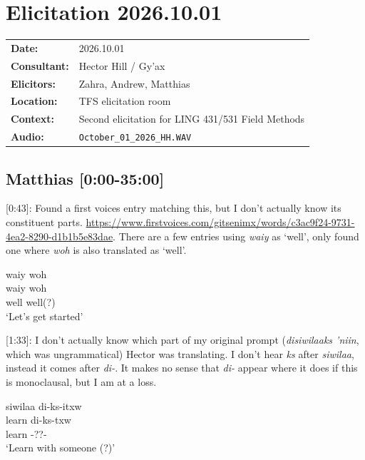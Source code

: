 \renewcommand{\ElicitationDate}{2026.10.01}

\section{Elicitation \ElicitationDate}

\begin{tabular}{ll}
\textbf{Date:} & \ElicitationDate \\
\textbf{Consultant:} & Hector Hill / Gy'ax \\
\textbf{Elicitors:} & Zahra, Andrew, Matthias \\
\textbf{Location:} & TFS elicitation room \\
\textbf{Context:} & Second elicitation for LING 431/531 Field Methods \\
\textbf{Audio:} & \texttt{October\_01\_2026\_HH.WAV} \\
\end{tabular}

\subsection{Matthias [0:00-35:00]}

[0:43]: Found a first voices entry matching this, but I don't actually know its constituent parts. \url{https://www.firstvoices.com/gitsenimx/words/c3ac9f24-9731-4ea2-8290-d1b1b5e83dae}. There are a few entries using \textit{waiy} as `well', only found one where \textit{woh} is also translated as `well'.

\begin{exe}
    \ex \glll waiy woh \\
    waiy woh \\
    well well(?) \\
    `Let's get started'
\end{exe}

[1:33]: I don't actually know which part of my original prompt (\textit{disiwilaaks 'niin}, which was ungrammatical) Hector was translating. I don't hear \textit{ks} after \textit{siwilaa}, instead it comes after \textit{di-}. It makes no sense that \textit{di-} appear where it does if this is monoclausal, but I am at a loss.
 
\begin{exe}
    \ex \glll siwilaa di-ks-itxw \\
    learn di-ks-txw \\
    learn \Com{}-??-\Val{} \\
    `Learn with someone (?)'
\end{exe}



